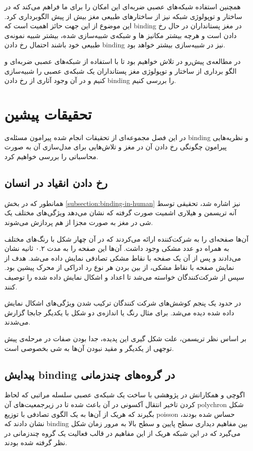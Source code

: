 \documentclass[12pt]{report}
\begin{document}
	همچنین استفاده شبکه‌های عصبی ضربه‌ای این امکان را برای ما فراهم می‌کند که در ساختار و توپولوژی شبکه نیز از ساختار‌های طبیعی مغز بیش از پیش الگوبرداری کرد. این موضوع از این جهت  حائز اهمیت است که \gls{binding} در مغز پستانداران در حال رخ دادن است و هرچه بیشتر مکانیز ها و شبکه‌ی شبیه‌سازی شده، بیشتر شبیه نمونه‌ی طبیعی خود باشند احتمال رخ دادن \gls{binding} نیز در شبیه‌سازی بیشتر خواهد بود.
	
	در مطالعه‌ی پیش‌رو در تلاش خواهیم بود تا با استفاده از شبکه‌های عصبی ضربه‌ای و الگو برداری از ساختار و توپولوژی مغز پستانداران یک شبکه‌ی عصبی را شبیه‌سازی کنیم و در آن وجود آثاری از رخ دادن \gls{binding} را بررسی کنیم.
	
	
	\chapter{تحقیقات پیشین}
	
	در این فصل مجموعه‌ای از تحقیقات انجام شده پیرامون مسئله‌ی \gls{binding} و نظریه‌هایی پیرامون چگونگی رخ دادن آن در مغز و تلاش‌هایی برای مدل‌سازی آن به صورت محاسباتی را بررسی خواهیم کرد.
	
	\section{رخ دادن انقیاد در انسان}
	همانطور که در بخش \ref{subsection:binding-in-human} نیز اشاره شد، تحقیقی توسط آنه تریسمن و هیلاری اشمیت صورت گرفته که نشان می‌دهد ویژگی‌های مختلف یک شی در مغز به صورت مجزا از هم پردازش می‌شوند. \cite{TREISMAN1982107}
	
	آن‌ها صفحه‌ای را به شرکت‌کننده ارائه می‌کردند که در آن چهار شکل با رنگ‌های مختلف به همراه دو عدد مشکی وجود داشت. آن‌ها این صفحه را به مدت ۰.۲ ثانیه نشان می‌دادند و پس از آن یک صفحه با نقاط مشکی تصادفی نمایش داده می‌شد. هدف از نمایش صفحه با نقاط مشکی، از بین بردن هر نوع رد ادراکی از محرک پیشین بود. سپس از شرکت‌کنندگان خواسته می‌شد تا اعداد و اشکال نمایش داده شده را توصیف کنند.
	
	در حدود یک پنجم کوشش‌های شرکت کنندگان ترکیب شدن ویژگی‌های اشکال نمایش داده شده دیده می‌شد. برای مثال رنگ یا اندازه‌ی دو شکل با یکدیگر جابجا گزارش می‌شدند.
	
	بر اساس نظر تریسمن، علت شکل گیری این پدیده، جدا بودن صفات در مرحله‌ی پیش توجهی از یکدیگر و مقید نبودن آن‌ها به شی‌ بخصوصی است. \cite{goldstein_2019}
	
	\section{پیدایش \gls{binding} در گروه‌های چندزمانی}
	اگوچی و همکارانش در پژوهشی
	\cite{EGUCHI2018a}
	با ساخت یک شبکه‌ی عصبی سلسله مراتبی که لحاظ کردن تاخیر انتقال آکسونی در آن باعث شده تا در زیرجمعیت‌های آن \gls{polychron}\cite{Izhikevich2006-dy} شکل بگیرند که هریک از آن‌ها به یک الگوی تصادفی با توزیع \gls{poisson} حساس شده بودند، نشان دادند که \gls{binding} بین مفاهیم دیداری سطح پایین و سطح بالا به مرور زمان شکل می‌گیرد که در این شبکه هریک از این مفاهیم در قالب فعالیت یک گروه چندزمانی در نظر گرفته شده بودند.
	
\end{document}
